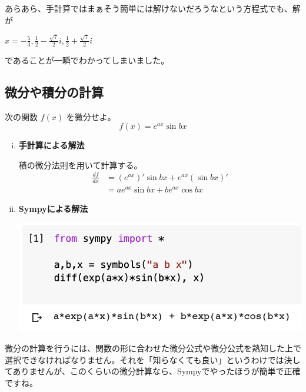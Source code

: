 \documentclass[9pt, a5paper,dvipdfmx]{jsbook}
\begin{document}
あらあら、手計算ではまぁそう簡単には解けないだろうなという方程式でも、解が

\large
$x = -\frac53,  \frac12 - \frac{\sqrt{7}}{2}i,  \frac12 + \frac{\sqrt{7}}{2}i$
\normalsize

であることが一瞬でわかってしまいました。
\subsection{微分や積分の計算}
\begin{framed}
\begin{exq}
次の関数
\large
$f(x)$
\normalsize
を微分せよ。
\large
$$f(x) = e^{ax}\sin{bx}$$
\normalsize
\end{exq}
\end{framed}
\begin{enumerate}[(i)]
    \item 
    {\bf 手計算による解法}

積の微分法則を用いて計算する。
\large
\begin{align*}
    \frac{df}{dx} &= (e^{ax})'\sin{bx} + e^{ax}(\sin{bx})'\\
    &= ae^{ax}\sin{bx} + be^{ax}\cos{bx}
\end{align*}
\normalsize
    \item
    {\bf Sympyによる解法}
    \begin{center}
    \includegraphics[scale=0.5]{fig1-2-5.png}
    \end{center}    
\end{enumerate}
微分の計算を行うには、関数の形に合わせた微分公式や微分公式を熟知した上で選択できなければなりません。それを「知らなくても良い」というわけでは決してありませんが、このくらいの微分計算なら、Sympyでやったほうが簡単で正確ですね。
\end{document}
